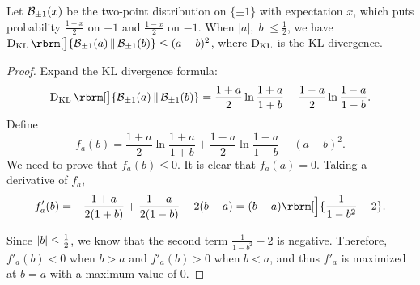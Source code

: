 \begin{lemma}\label{lem:kl-bernoulli}
    Let $\mathcal{B}_{\pm 1}(x)$ be the two-point distribution on $\{\pm 1\}$ with expectation $x$, which puts probability $\frac{1+x}{2}$ on $+1$ and $\frac{1-x}{2}$ on $-1$. When $|a|, |b|\leq \frac12$, we have $\KL\rbrm[\big]{\Twopoint(a)\,\|\,\Twopoint(b)}\leq (a-b)^2$, where $\operatorname{D}_{\mathrm{KL}}$ is the KL divergence.
\end{lemma}
\begin{proof}
    Expand the KL divergence formula:
    \begin{equation*}
        \KL\rbrm[\big]{\Twopoint(a)\,\|\,\Twopoint(b)}=\frac{1+a}{2}\ln\frac{1+a}{1+b}+\frac{1-a}{2}\ln\frac{1-a}{1-b}.
    \end{equation*}
    Define
    \begin{equation*}
        f_a(b)=\frac{1+a}{2}\ln\frac{1+a}{1+b}+\frac{1-a}{2}\ln\frac{1-a}{1-b} - (a-b)^2.
    \end{equation*}
    We need to prove that $f_a(b)\leq 0$. It is clear that $f_a(a)=0$. Taking a derivative of $f_a$,
    \begin{equation*}
        f'_a(b)=-\frac{1+a}{2(1+b)}+\frac{1-a}{2(1-b)}-2(b-a)=(b-a)\rbrm[\Big]{\frac{1}{1-b^2}-2}.
    \end{equation*}

    Since $\abs{b}\leq \frac12$, we know that the second term $\frac{1}{1-b^2}-2$ is negative. Therefore, $f'_a(b)<0$ when $b>a$ and $f'_a(b)>0$ when $b<a$, and thus $f'_a$ is maximized at $b=a$ with a maximum value of 0.
\end{proof}

